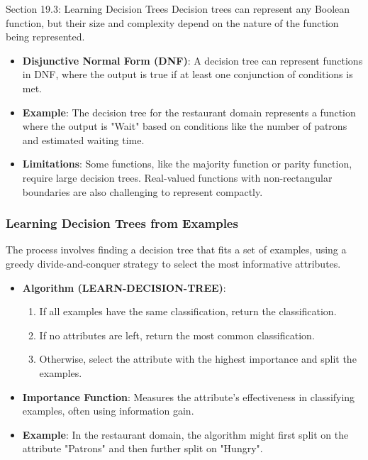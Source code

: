 \begin{notes}{Section 19.3: Learning Decision Trees}
    Decision trees can represent any Boolean function, but their size and complexity depend on the nature of the function being represented.
    
    \begin{highlight}
    
        \begin{itemize}
            \item \textbf{Disjunctive Normal Form (DNF)}: A decision tree can represent functions in DNF, where the output is true if at least one conjunction of conditions is met.
            \item \textbf{Example}: The decision tree for the restaurant domain represents a function where the output is "Wait" based on conditions like the number of patrons and estimated waiting time.
            \item \textbf{Limitations}: Some functions, like the majority function or parity function, require large decision trees. Real-valued functions with non-rectangular boundaries are also challenging 
            to represent compactly.
        \end{itemize}
    
    \end{highlight}
    
    \subsubsection*{Learning Decision Trees from Examples}
    
    The process involves finding a decision tree that fits a set of examples, using a greedy divide-and-conquer strategy to select the most informative attributes.
    
    \begin{highlight}
    
        \begin{itemize}
            \item \textbf{Algorithm (LEARN-DECISION-TREE)}:
            \begin{enumerate}
                \item If all examples have the same classification, return the classification.
                \item If no attributes are left, return the most common classification.
                \item Otherwise, select the attribute with the highest importance and split the examples.
            \end{enumerate}
            \item \textbf{Importance Function}: Measures the attribute's effectiveness in classifying examples, often using information gain.
            \item \textbf{Example}: In the restaurant domain, the algorithm might first split on the attribute "Patrons" and then further split on "Hungry".
        \end{itemize}
    

\end{highlight}
\end{notes}
